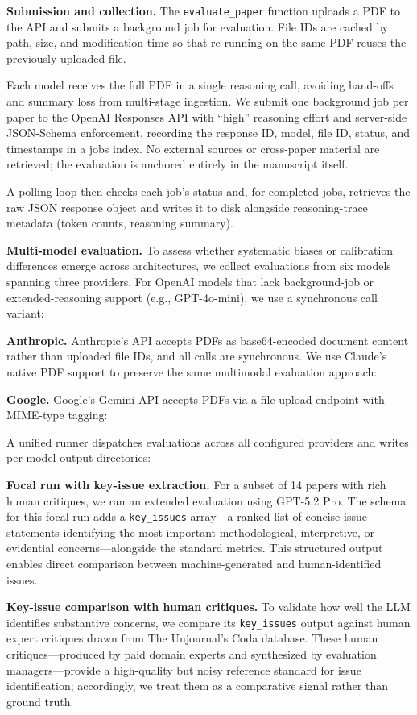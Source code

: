 \documentclass[
  11pt,
  letterpaper,
]{article}
\begin{document}
\textbf{Submission and collection.} The \texttt{evaluate\_paper}
function uploads a PDF to the API and submits a background job for
evaluation. File IDs are cached by path, size, and modification time so
that re-running on the same PDF reuses the previously uploaded file.

Each model receives the full PDF in a single reasoning call, avoiding
hand-offs and summary loss from multi-stage ingestion. We submit one
background job per paper to the OpenAI Responses API with ``high''
reasoning effort and server-side JSON-Schema enforcement, recording the
response ID, model, file ID, status, and timestamps in a jobs index. No
external sources or cross-paper material are retrieved; the evaluation
is anchored entirely in the manuscript itself.

A polling loop then checks each job's status and, for completed jobs,
retrieves the raw JSON response object and writes it to disk alongside
reasoning-trace metadata (token counts, reasoning summary).

\textbf{Multi-model evaluation.} To assess whether systematic biases or
calibration differences emerge across architectures, we collect
evaluations from six models spanning three providers. For OpenAI models
that lack background-job or extended-reasoning support (e.g.,
GPT-4o-mini), we use a synchronous call variant:

\textbf{Anthropic.} Anthropic's API accepts PDFs as base64-encoded
document content rather than uploaded file IDs, and all calls are
synchronous. We use Claude's native PDF support to preserve the same
multimodal evaluation approach:

\textbf{Google.} Google's Gemini API accepts PDFs via a file-upload
endpoint with MIME-type tagging:

A unified runner dispatches evaluations across all configured providers
and writes per-model output directories:

\textbf{Focal run with key-issue extraction.} For a subset of 14 papers
with rich human critiques, we ran an extended evaluation using GPT-5.2
Pro. The schema for this focal run adds a \texttt{key\_issues} array---a
ranked list of concise issue statements identifying the most important
methodological, interpretive, or evidential concerns---alongside the
standard metrics. This structured output enables direct comparison
between machine-generated and human-identified issues.

\textbf{Key-issue comparison with human critiques.} To validate how well
the LLM identifies substantive concerns, we compare its
\texttt{key\_issues} output against human expert critiques drawn from
The Unjournal's Coda database. These human critiques---produced by paid
domain experts and synthesized by evaluation managers---provide a
high-quality but noisy reference standard for issue identification;
accordingly, we treat them as a comparative signal rather than ground
truth.
\end{document}
